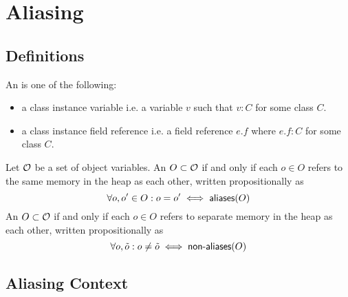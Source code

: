 

\section{Aliasing}

\subsection{Definitions}

An  is one of the following:
\begin{itemize}
  \item a class instance variable i.e. a variable $v$ such that $v : C$ for some class $C$.
  \item a class instance field reference i.e. a field reference $e.f$ where $e.f : C$ for some class $C$.
\end{itemize}
Let $\mathcal{O}$ be a set of object variables.
An $O \subset \mathcal{O}$  if and only if
each $o \in O$ refers to the same memory in the heap as each other,
written propositionally as
$$
  \forall o, o^\prime \in O : o = o^\prime \iff \textsf{aliases}(O)
$$
An $O \subset \mathcal{O}$  if and only if
each $o \in O$ refers to separate memory in the heap as each other,
written propositionally as
$$
  \forall o, \tilde o : o \neq \tilde o \iff \textsf{non-aliases}(O)
$$

\subsection{Aliasing Context}

